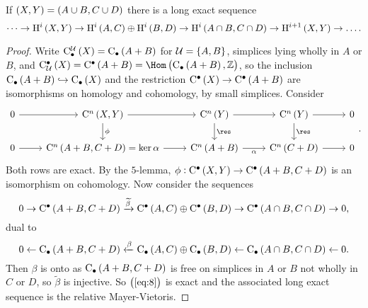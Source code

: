 \begin{lemma}
If $ \br{X, Y} = \br{A \cup B, C \cup D} $ there is a long exact sequence
$$ \dots \to \H^i\br{X, Y} \to \H^i\br{A, C} \oplus \H^i\br{B, D} \to \H^i\br{A \cap B, C \cap D} \to \H^{i + 1}\br{X, Y} \to \dots. $$
\end{lemma}

\begin{proof}
Write $ \C_\bullet^\UUU\br{X} = \C_\bullet\br{A + B} $ for $ \UUU = \cbr{A, B} $, simplices lying wholly in $ A $ or $ B $, and $ \C_\UUU^\bullet\br{X} = \C^\bullet\br{A + B} = \Hom\br{\C_\bullet\br{A + B}, \ZZ} $, so the inclusion $ \C_\bullet\br{A + B} \hookrightarrow \C_\bullet\br{X} $ and the restriction $ \C^\bullet\br{X} \to \C^\bullet\br{A + B} $ are isomorphisms on homology and cohomology, by small simplices. Consider
$$
\begin{tikzcd}
0 \arrow{r} & \C^n\br{X, Y} \arrow{r} \arrow{d}{\phi} & \C^n\br{Y} \arrow{r} \arrow{d}{\res} & \C^n\br{Y} \arrow{r} \arrow{d}{\res} & 0 \\
0 \arrow{r} & \C^n\br{A + B, C + D} = \ker \alpha \arrow{r} & \C^n\br{A + B} \arrow{r}[swap]{\alpha} & \C^n\br{C + D} \arrow{r} & 0
\end{tikzcd}.
$$
Both rows are exact. By the $ 5 $-lemma, $ \phi : \C^\bullet\br{X, Y} \to \C^\bullet\br{A + B, C + D} $ is an isomorphism on cohomology. Now consider the sequences
\begin{equation}
\label{eq:8}
0 \to \C^\bullet\br{A + B, C + D} \xrightarrow{\widetilde{\beta}} \C^\bullet\br{A, C} \oplus \C^\bullet\br{B, D} \to \C^\bullet\br{A \cap B, C \cap D} \to 0,
\end{equation}
dual to
$$ 0 \from \C_\bullet\br{A + B, C + D} \xleftarrow{\beta} \C_\bullet\br{A, C} \oplus \C_\bullet\br{B, D} \from \C_\bullet\br{A \cap B, C \cap D} \from 0. $$
Then $ \beta $ is onto as $ \C_\bullet\br{A + B, C + D} $ is free on simplices in $ A $ or $ B $ not wholly in $ C $ or $ D $, so $ \widetilde{\beta} $ is injective. So $ \br{\ref{eq:8}} $ is exact and the associated long exact sequence is the relative Mayer-Vietoris.
\end{proof}

\pagebreak

